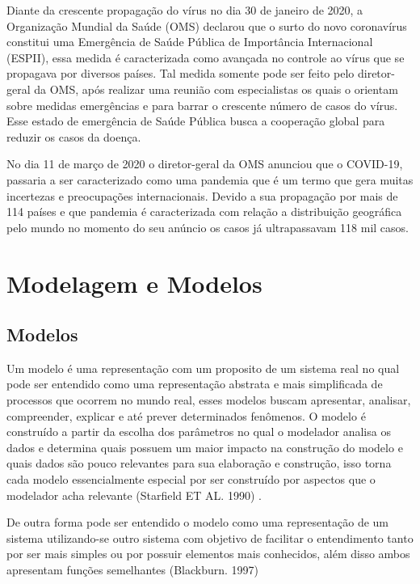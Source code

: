 Diante da crescente propagação do vírus no dia 30 de janeiro de 2020, a Organização Mundial da Saúde (OMS) declarou que o surto do novo coronavírus constitui uma Emergência de Saúde Pública de Importância Internacional (ESPII), essa medida é caracterizada como avançada no controle ao vírus que se propagava por diversos países. Tal medida somente pode ser feito pelo diretor-geral da OMS, após realizar uma reunião com especialistas os quais o orientam sobre medidas emergências e para barrar o crescente número de casos do vírus. Esse estado de emergência de Saúde Pública busca a cooperação global para reduzir os casos da doença.

No dia 11 de março de 2020 o diretor-geral da OMS anunciou que o COVID-19, passaria a ser caracterizado como uma pandemia que é um termo que gera muitas incertezas e preocupações internacionais. Devido a sua propagação por mais de 114 países e que pandemia é caracterizada com relação a distribuição geográfica pelo mundo  no momento do seu anúncio os casos já ultrapassavam 118 mil casos.

\section{Modelagem e Modelos}

\subsection{Modelos}

Um modelo é uma representação com um proposito de um sistema real no qual pode ser entendido como uma representação abstrata e mais simplificada de processos que ocorrem no mundo real, esses modelos buscam apresentar, analisar, compreender, explicar e até prever determinados fenômenos. O modelo é construído a partir da escolha dos parâmetros no qual o modelador analisa os dados e determina quais possuem um maior impacto na construção do modelo e quais dados são pouco relevantes para sua elaboração e construção, isso torna cada modelo essencialmente especial por ser construído por aspectos que o modelador acha relevante (Starfield ET AL. 1990) \cite{Qualitat24:online}. 

De outra forma pode ser entendido o modelo como uma representação de um sistema utilizando-se outro sistema com objetivo de facilitar o entendimento tanto por ser mais simples ou por possuir elementos mais conhecidos, além disso ambos apresentam funções semelhantes (Blackburn. 1997)\cite{blackburn}

